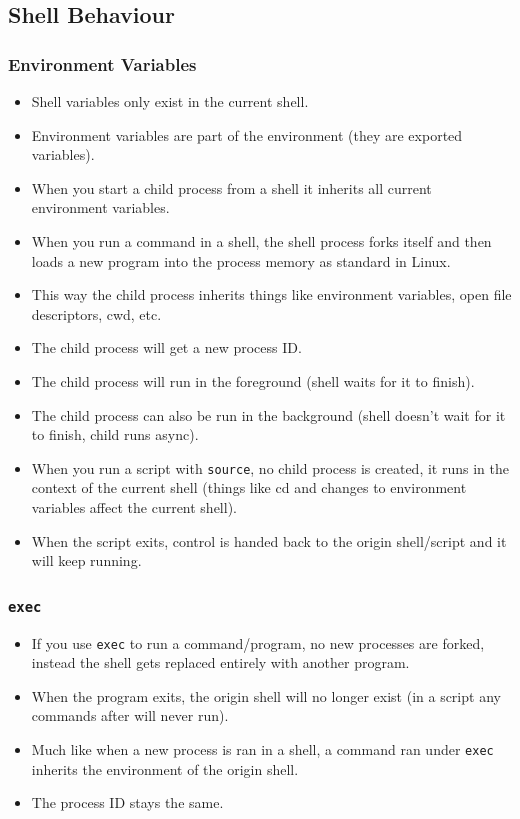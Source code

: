 \documentclass{article}
\newcommand{\code}[1]{\texttt{#1}}
\begin{document}
\subsection{Shell Behaviour}

\subsubsection{Environment Variables}

\begin{itemize}
    \item Shell variables only exist in the current shell.
    \item Environment variables are part of the environment (they are exported variables).
    \item When you start a child process from a shell it inherits all current environment variables.
    \item When you run a command in a shell, the shell process forks itself and then loads a new program into the process memory as standard in Linux.
    \item This way the child process inherits things like environment variables, open file descriptors, cwd, etc.
    \item The child process will get a new process ID.
    \item The child process will run in the foreground (shell waits for it to finish).
    \item The child process can also be run in the background (shell doesn't wait for it to finish, child runs async).
    \item When you run a script with \code{source}, no child process is created, it runs in the context of the current shell (things like cd and changes to environment variables affect the current shell).
    \item When the script exits, control is handed back to the origin shell/script and it will keep running.
\end{itemize}

\subsubsection{\code{exec}}

\begin{itemize}
    \item If you use \code{exec} to run a command/program, no new processes are forked, instead the shell gets replaced entirely with another program.
    \item When the program exits, the origin shell will no longer exist (in a script any commands after will never run).
    \item Much like when a new process is ran in a shell, a command ran under \code{exec} inherits the environment of the origin shell.
    \item The process ID stays the same.
\end{itemize}
\end{document}
